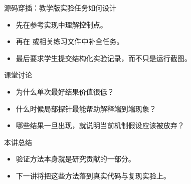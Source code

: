 \begin{frame}{源码穿插：教学版实验任务如何设计}
  \begin{itemize}
    \item 先在参考实现中理解控制点。
    \item 再在 \texttt{} 或相关练习文件中补全任务。
    \item 最后要求学生提交结构化实验记录，而不只是运行截图。
  \end{itemize}
\end{frame}



\begin{frame}{课堂讨论}
  \begin{itemize}
    \item 为什么单次最好结果价值很低？
    \item 什么时候局部探针最能帮助解释端到端现象？
    \item 哪些结果一旦出现，就说明当前机制假设应该被放弃？
  \end{itemize}
\end{frame}

\begin{frame}{本讲总结}
  \begin{itemize}
    \item 验证方法本身就是研究贡献的一部分。
    \item 下一讲将把这些方法落到真实代码与复现实验上。
  \end{itemize}
\end{frame}

